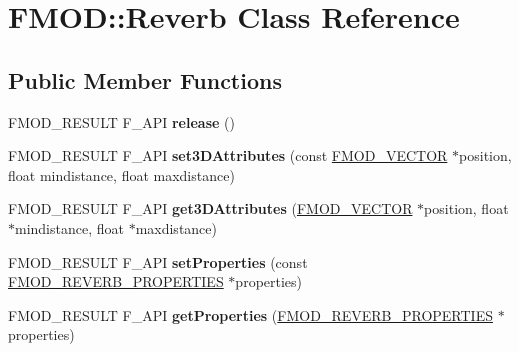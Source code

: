 \hypertarget{class_f_m_o_d_1_1_reverb}{}\section{F\+M\+OD\+:\+:Reverb Class Reference}
\label{class_f_m_o_d_1_1_reverb}
\subsection*{Public Member Functions}
\begin{DoxyCompactItemize}
\item 
F\+M\+O\+D\+\_\+\+R\+E\+S\+U\+LT F\+\_\+\+A\+PI {\bfseries release} ()\hypertarget{class_f_m_o_d_1_1_reverb_affc0f1977a5a5189f3aa2f70ae884aa7}{}\label{class_f_m_o_d_1_1_reverb_affc0f1977a5a5189f3aa2f70ae884aa7}

\item 
F\+M\+O\+D\+\_\+\+R\+E\+S\+U\+LT F\+\_\+\+A\+PI {\bfseries set3\+D\+Attributes} (const \hyperlink{struct_f_m_o_d___v_e_c_t_o_r}{F\+M\+O\+D\+\_\+\+V\+E\+C\+T\+OR} $\ast$position, float mindistance, float maxdistance)\hypertarget{class_f_m_o_d_1_1_reverb_af1ada1ea4d3f32e28d462ab5ccf06314}{}\label{class_f_m_o_d_1_1_reverb_af1ada1ea4d3f32e28d462ab5ccf06314}

\item 
F\+M\+O\+D\+\_\+\+R\+E\+S\+U\+LT F\+\_\+\+A\+PI {\bfseries get3\+D\+Attributes} (\hyperlink{struct_f_m_o_d___v_e_c_t_o_r}{F\+M\+O\+D\+\_\+\+V\+E\+C\+T\+OR} $\ast$position, float $\ast$mindistance, float $\ast$maxdistance)\hypertarget{class_f_m_o_d_1_1_reverb_aa5d6fae46d291616cf583e68410390dc}{}\label{class_f_m_o_d_1_1_reverb_aa5d6fae46d291616cf583e68410390dc}

\item 
F\+M\+O\+D\+\_\+\+R\+E\+S\+U\+LT F\+\_\+\+A\+PI {\bfseries set\+Properties} (const \hyperlink{struct_f_m_o_d___r_e_v_e_r_b___p_r_o_p_e_r_t_i_e_s}{F\+M\+O\+D\+\_\+\+R\+E\+V\+E\+R\+B\+\_\+\+P\+R\+O\+P\+E\+R\+T\+I\+ES} $\ast$properties)\hypertarget{class_f_m_o_d_1_1_reverb_a8b247009376148800cd70b444e702179}{}\label{class_f_m_o_d_1_1_reverb_a8b247009376148800cd70b444e702179}

\item 
F\+M\+O\+D\+\_\+\+R\+E\+S\+U\+LT F\+\_\+\+A\+PI {\bfseries get\+Properties} (\hyperlink{struct_f_m_o_d___r_e_v_e_r_b___p_r_o_p_e_r_t_i_e_s}{F\+M\+O\+D\+\_\+\+R\+E\+V\+E\+R\+B\+\_\+\+P\+R\+O\+P\+E\+R\+T\+I\+ES} $\ast$properties)\hypertarget{class_f_m_o_d_1_1_reverb_a70d4d392767ba5aca142232a89fc1a5c}{}\label{class_f_m_o_d_1_1_reverb_a70d4d392767ba5aca142232a89fc1a5c}


\end{DoxyCompactItemize}
